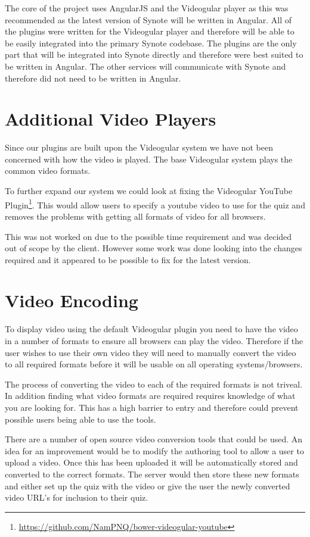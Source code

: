 The core of the project uses \gls{AngularJS} and the \gls{Videogular} player as this was recommended as the latest version of Synote will be written in Angular. All of the plugins were written for the \gls{Videogular} player and therefore will be able to be easily integrated into the primary Synote codebase. The plugins are the only part that will be integrated into Synote directly and therefore were best suited to be written in Angular. The other services will communicate with Synote and therefore did not need to be written in Angular.

\section{Additional Video Players}

Since our plugins are built upon the \gls{Videogular} system we have not been concerned with how the video is played. The base \gls{Videogular} system plays the common video formats.

To further expand our system we could look at fixing the \gls{Videogular} YouTube Plugin\footnote{\url{https://github.com/NamPNQ/bower-videogular-youtube}}. This would allow users to specify a youtube video to use for the quiz and removes the problems with getting all formats of video for all browsers.

This was not worked on due to the possible time requirement and was decided out of scope by the client. However some work was done looking into the changes required and it appeared to be possible to fix for the latest version.

\section{Video Encoding}

To display video using the default Videogular plugin you need to have the video in a number of formats to ensure all browsers can play the video. Therefore if the user wishes to use their own video they will need to manually convert the video to all required formats before it will be usable on all operating systems/browsers.

The process of converting the video to each of the required formats is not triveal. In addition finding what video formats are required requires knowledge of what you are looking for. This has a high barrier to entry and therefore could prevent possible users being able to use the tools.

There are a number of open source video conversion tools that could be used. An idea for an improvement would be to modify the authoring tool to allow a user to upload a video. Once this has been uploaded it will be automatically stored and converted to the correct formats. The server would then store these new formats and either set up the quiz with the video or give the user the newly converted video URL's for inclusion to their quiz.

